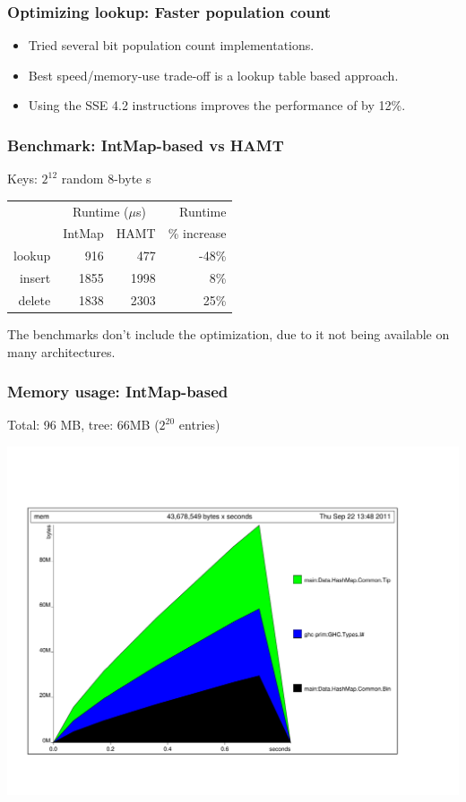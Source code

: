 \documentclass[xetex,mathserif,serif]{beamer}
\newcommand{\code}[1]{\mbox{\texttt{\small{\color{CodeColor}{#1}}}}}
\begin{document}
\begin{frame}
  \frametitle{Optimizing lookup: Faster population count}
  \begin{itemize}
  \item Tried several bit population count implementations.
  \item Best speed/memory-use trade-off is a lookup table based
    approach.
  \item Using the \code{POPCNT} SSE 4.2 instructions improves the
    performance of \code{lookup} by 12\%.
  \end{itemize}
\end{frame}

\begin{frame}
  \frametitle{Benchmark: IntMap-based vs HAMT}

  Keys: $2^{12}$ random 8-byte \code{ByteString}s

  \bigskip
  \begin{center}
  \begin{tabular}{r|rrr}
                  & \multicolumn{2}{c}{Runtime ($\mu$s)} & Runtime \\
                  & IntMap & HAMT                      & \% increase \\
    \hline lookup &  916 &  477 & -48\% \\
           insert & 1855 & 1998 & 8\% \\
           delete & 1838 & 2303 & 25\% \\
  \end{tabular}
  \end{center}

  The benchmarks don't include the \code{POPCNT} optimization, due to
  it not being available on many architectures.
\end{frame}

\begin{frame}
  \frametitle{Memory usage: IntMap-based}
  Total: 96 MB, tree: 66MB ($2^{20}$ \code{Int} entries)
  \begin{center}
  \includegraphics[angle=90,scale=0.3]{patricia-mem.pdf}
  \end{center}
\end{frame}
\end{document}
